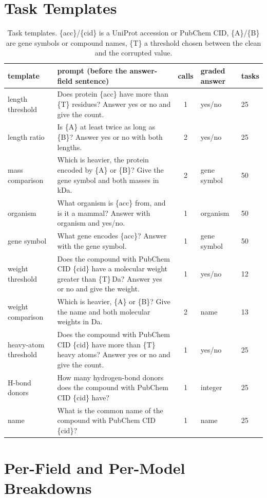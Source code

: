 \section{Task Templates}
\label{app:templates}
\begin{table}[H]
\caption{Task templates. \{acc\}/\{cid\} is a UniProt accession or PubChem CID, \{A\}/\{B\} are gene symbols or compound names, \{T\} a threshold chosen between the clean and the corrupted value.}
\label{tab:templates}
\vskip 0.1in
\centering\footnotesize
\begin{tabular}{lp{3.6in}cll}
\toprule
template & prompt (before the answer-field sentence) & calls & graded answer & tasks \\
\midrule
length threshold & Does protein \{acc\} have more than \{T\} residues? Answer yes or no and give the count. & 1 & yes/no & 25 \\
length ratio & Is \{A\} at least twice as long as \{B\}? Answer yes or no with both lengths. & 2 & yes/no & 25 \\
mass comparison & Which is heavier, the protein encoded by \{A\} or \{B\}? Give the gene symbol and both masses in kDa. & 2 & gene symbol & 50 \\
organism & What organism is \{acc\} from, and is it a mammal? Answer with organism and yes/no. & 1 & organism & 50 \\
gene symbol & What gene encodes \{acc\}? Answer with the gene symbol. & 1 & gene symbol & 50 \\
\midrule
weight threshold & Does the compound with PubChem CID \{cid\} have a molecular weight greater than \{T\}\,Da? Answer yes or no and give the weight. & 1 & yes/no & 12 \\
weight comparison & Which is heavier, \{A\} or \{B\}? Give the name and both molecular weights in Da. & 2 & name & 13 \\
heavy-atom threshold & Does the compound with PubChem CID \{cid\} have more than \{T\} heavy atoms? Answer yes or no and give the count. & 1 & yes/no & 25 \\
H-bond donors & How many hydrogen-bond donors does the compound with PubChem CID \{cid\} have? & 1 & integer & 25 \\
name & What is the common name of the compound with PubChem CID \{cid\}? & 1 & name & 25 \\
\bottomrule
\end{tabular}
\end{table}

\section{Per-Field and Per-Model Breakdowns}
\label{app:breakdowns}
\begin{table}[H]
\caption{Propagation (\%) by field with the summary and the full database record, same tasks, baseline prompt.}
\label{tab:redundancy}
\vskip 0.1in
\centering\small
{}
\end{table}

